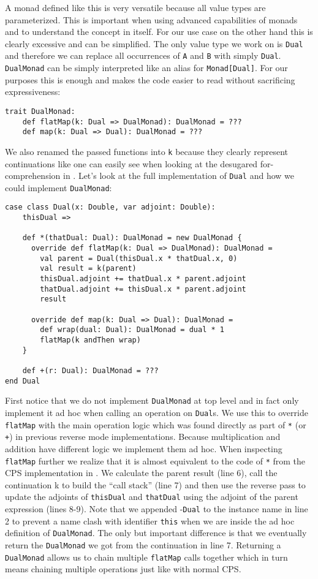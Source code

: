 A monad defined like this is very versatile because all value types are parameterized. This is important when using advanced capabilities of monads and to understand the concept in itself. For our use case on the other hand this is clearly excessive and can be simplified. The only value type we work on is \lstinline{Dual} and therefore we can replace all occurrences of \lstinline{A} and \lstinline{B} with simply \lstinline{Dual}. \lstinline{DualMonad} can be simply interpreted like an alias for \lstinline{Monad[Dual]}. For our purposes this is enough and makes the code easier to read without sacrificing expressiveness:
\begin{lstlisting}
trait DualMonad:
    def flatMap(k: Dual => DualMonad): DualMonad = ???
    def map(k: Dual => Dual): DualMonad = ???
\end{lstlisting}
We also renamed the passed functions into \lstinline{k} because they clearly represent continuations like one can easily see when looking at the desugared for-comprehension in . Let's look at the full implementation of \lstinline{Dual} and how we could implement \lstinline{DualMonad}:
\begin{lstlisting}
case class Dual(x: Double, var adjoint: Double):
    thisDual =>
  
    def *(thatDual: Dual): DualMonad = new DualMonad {
      override def flatMap(k: Dual => DualMonad): DualMonad =
        val parent = Dual(thisDual.x * thatDual.x, 0)
        val result = k(parent)
        thisDual.adjoint += thatDual.x * parent.adjoint
        thatDual.adjoint += thisDual.x * parent.adjoint
        result
  
      override def map(k: Dual => Dual): DualMonad =
        def wrap(dual: Dual): DualMonad = dual * 1
        flatMap(k andThen wrap)
    }

    def +(r: Dual): DualMonad = ???
end Dual
\end{lstlisting}
First notice that we do not implement \lstinline{DualMonad} at top level and in fact only implement it ad hoc when calling an operation on \lstinline{Dual}s. We use this to override \lstinline{flatMap} with the main operation logic which was found directly as part of \lstinline{*} (or \lstinline{+}) in previous reverse mode implementations. Because multiplication and addition have different logic we implement them ad hoc. When inspecting \lstinline{flatMap} further we realize that it is almost equivalent to the code of \lstinline{*} from the CPS implementation in . We calculate the parent result (line 6), call the continuation k to build the ``call stack'' (line 7) and then use the reverse pass to update the adjoints of \lstinline{thisDual} and \lstinline{thatDual} using the adjoint of the parent expression (lines 8-9). Note that we appended -\lstinline{Dual} to the instance name in line 2 to prevent a name clash with identifier \lstinline{this} when we are inside the ad hoc definition of \lstinline{DualMonad}. The only but important difference is that we eventually return the \lstinline{DualMonad} we got from the continuation in line 7. Returning a \lstinline{DualMonad} allows us to chain multiple \lstinline{flatMap} calls together which in turn means chaining multiple operations just like with normal CPS.

